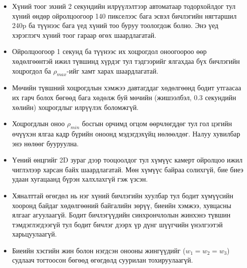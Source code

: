 \begin{itemize}
\item
  Хүний тоог эхний 2 секундийн илрүүлэлтээр автоматаар тодорхойлдог тул хүний өндөр ойролцоогоор 140 пикселээс бага эсвэл бичлэгийн нягтаршил 240p ба түүнээс бага үед хүний тоо буруу тоологдож болно. Энэ үед хэрэглэгч хүний тоог гараар өгөх шаардлагатай.
\item
  Ойролцоогоор 1 секунд ба түүнээс их хоцрогдол оноогоороо өөр хөдөлгөөнтэй ижил түвшинд хүрдэг тул тэдгээрийг ялгахдаа бүх бичлэгийн хоцрогдол ба \(\rho_{max}\)-ийг хамт харах шаардлагатай.
\item
  Мөчийн түвшний хоцрогдлын хэмжээ давтагддаг хөдөлгөөнд бодит утгаасаа их гарч болох бөгөөд бага хөдөлж буй мөчийн (жишээлбэл, 0.3 секундийн хөлийн) хоцрогдлыг илрүүлэх боломжгүй.
\item
  Хоцрогдлын оноо \(\rho_{min}\) босгын орчимд огцом өөрчлөгддөг тул гол цэгийн өчүүхэн ялгаа кадр бүрийн оноонд мэдэгдэхүйц нөлөөлдөг. Налуу хувилбар энэ нөлөөг бууруулна.
\item
  Үений өнцгийг 2D зураг дээр тооцоолдог тул хүмүүс камерт ойролцоо ижил чиглэлээр харсан байх шаардлагатай. Мөн хүмүүс байраа солихгүй, бие биеэ удаан хугацаанд бүрэн халхлахгүй гэж үзсэн.
\item
  Хяналттай өгөгдөл нь нэг хүний бичлэгийн хуулбар тул бодит хүмүүсийн хооронд байдаг хөдөлгөөний байгалийн зөрүү, биеийн хэмжээ, хувцасны ялгааг агуулаагүй. Бодит бичлэгүүдийн синхрончлолын жинхэнэ түвшин тэмдэглэгдээгүй тул бодит бичлэг дээрх үр дүнг шүүгчийн үнэлгээтэй харьцуулаагүй.
\item
  Биеийн хэсгийн жин болон нэгдсэн онооны жингүүдийг (\(w_1 = w_2 = w_3\)) судлаач тогтоосон бөгөөд өгөгдөлд суурилан тохируулаагүй.
\end{itemize}
